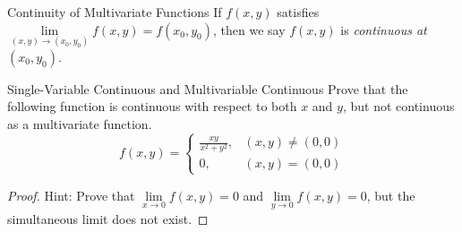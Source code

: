 \begin{definition}{Continuity of Multivariate Functions}{}
  If $f(x, y)$ satisfies $\lim \limits _{(x,y)\rightarrow (x_0, y_0)} f(x,y) =
  f(x_0, y_0)$,
  then we say $f(x,y)$ is \emph{continuous at $(x_0, y_0)$}.
\end{definition}

\begin{example}{Single-Variable Continuous and Multivariable Continuous}{}
  Prove that the following function is continuous with respect to both $x$ and
  $y$,
  but not continuous as a multivariate function.
  \begin{equation}
    f(x,y)=\begin{cases}
      \frac{xy}{x^2+y^2},&(x,y)\neq(0,0)\\
      0,&(x,y)=(0,0)
    \end{cases}
  \end{equation}
\end{example}

\begin{proof}
  Hint: Prove that $\lim \limits _{x \rightarrow 0} f(x,y) = 0$ and $\lim
  \limits _{y \rightarrow 0} f(x,y) = 0$,
  but the simultaneous limit does not exist.
\end{proof}

